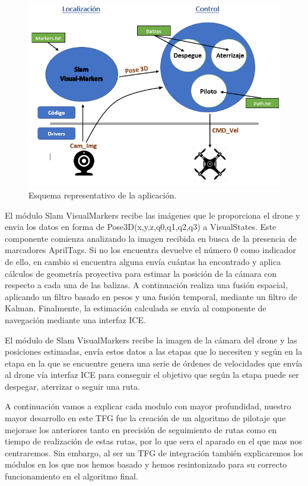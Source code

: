 \begin{figure}[H]
	\begin{center}
		\includegraphics[width=1.1\textwidth]{imag/IMG31.PNG}
				\caption{Esquema representativo de la aplicación.}
		\label{fig:Esquema representativo.}	
	\end{center}
\end{figure}

\hspace{1cm} El módulo Slam VisualMarkers recibe las imágenes que le proporciona el drone y envia los datos en forma de Pose3D(x,y,z,q0,q1,q2,q3) a VisualStates. Este componente comienza analizando la imagen recibida en busca de la presencia de marcadores AprilTags. Si no los encuentra devuelve el número 0 como indicador de ello, en cambio si encuentra alguna envía cuántas ha encontrado y aplica cálculos de geometría proyectiva para estimar la posición de la cámara con respecto a cada una de las balizas. A continuación realiza una fusión espacial, aplicando un filtro basado en pesos y una fusión temporal, mediante un filtro de Kalman. Finalmente, la estimación calculada se envía al componente de navegación mediante una interfaz ICE.

\hspace{1cm} El módulo de Slam VisualMarkers recibe la imagen de la cámara del drone y las posiciones estimadas, envía estos datos a las etapas que lo necesiten y según en la etapa en la que se encuentre genera una serie de órdenes de velocidades que envía al drone vía interfaz ICE para conseguir el objetivo que según la etapa puede ser despegar, aterrizar o seguir una ruta.

\hspace{1cm} A continuación vamos a explicar cada modulo con mayor profundidad, nuestro mayor desarrollo en este TFG fue la creación de un algoritmo de pilotaje que mejorase los anteriores tanto en precisión de seguimiento de rutas como en tiempo de realización de estas rutas, por lo que sera el aparado en el que mas nos centraremos. Sin embargo, al ser un TFG de integración también explicaremos los módulos en los que nos hemos basado y hemos resintonizado para su correcto funcionamiento en el algoritmo final. 

